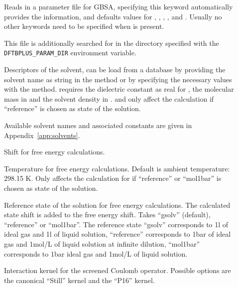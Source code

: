 \begin{description}
  \item[] Reads in a parameter file for GBSA, specifying this
    keyword automatically provides the  information, and defaults
    values for , , , 
    ,  and .
    Usually no other keywords need to be specified when  is present.

    This file is additionally searched for in the directory specified with the
    \texttt{DFTBPLUS\_PARAM\_DIR} environment variable.

  \item[] Descriptors of the solvent, can be load from a database
    by providing the solvent name as string in the  method or
    by specifying the necessary values with the  method.
     requires the dielectric constant as real for ,
    the molecular mass in   and the
    solvent density in  .
     and  only affect the calculation if
    ``reference'' is chosen as state of the solution.

    Available solvent names and associated constants are given in Appendix~\ref{app:solvents}.

  \item[]  Shift for free energy
    calculations.

  \item[] Temperature for free energy calculations. Default is
    ambient temperature: 298.15 K.
    Only affects the calculation for if ``reference'' or ``mol1bar'' is chosen
    as state of the solution.

  \item[] 
    Reference state of the solution for free energy calculations.
    The calculated state shift is added to the free energy shift.
    Takes ``gsolv'' (default), ``reference'' or ``mol1bar''.
    The reference state ``gsolv'' corresponds to 1\;l of ideal gas and 1\;l of
    liquid  solution,
    ``reference'' corresponds to 1\;bar of ideal gas and 1\;mol/L of liquid
    solution at infinite dilution,
    ``mol1bar'' corresponds to 1\;bar ideal gas and 1\;mol/L of liquid solution.

  \item[]
    Interaction kernel for the screened Coulomb operator.
    Possible options are the canonical ``Still'' kernel\cite{still1990} and the
    ``P16'' kernel.\cite{lange2012}


\end{description}
